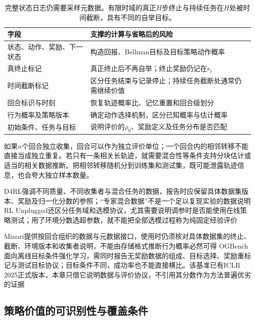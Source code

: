 \begin{table}[htbp]
  \centering
  \small
  \begin{tabularx}{\linewidth}{p{29mm}X}
    \toprule
    字段 & 支撑的计算与省略后的风险 \\
    \midrule
    状态、动作、奖励、下一状态 & 构造回报、Bellman目标及目标策略动作概率 \\
    真终止标记 & 真正终止后不再自举；终止奖励仍记在$r_t$ \\
    时间截断标记 & 区分任务结束与记录停止；持续任务截断处通常仍需继续价值 \\
    回合标识与时刻 & 恢复轨迹概率比、记忆重置和回合级划分 \\
    行为概率及策略版本 & 确定动作选择机制，区分已知概率与估计概率 \\
    初始条件、任务与目标 & 说明评价的$\rho_0$、奖励定义及任务分布是否匹配 \\
    \bottomrule
  \end{tabularx}
  \caption{完整状态日志仍需要采样元数据。有限时域的真正$H$步终止与持续任务在$H$处被时间截断，具有不同的自举目标。}
  \label{tab:rl-information-fields}
\end{table}

如果$n$个回合独立收集，回合可以作为独立评价单位；一个回合内的相邻转移不能直接当成独立重复。若只有一条相关长轨迹，就需要混合性等条件支持分块估计或适当的相关数据推断。把相邻转移随机分到训练集和测试集，既可能泄露轨迹信息，也会夸大独立样本数量。

D4RL强调不同质量、不同收集者与混合任务的数据，报告时应保留具体数据集版本、奖励及归一化分数的参照；“专家混合数据”不是一个足以复现实验的数据说明
RL Unplugged还区分任务域和选模协议，尤其需要说明调参时是否能使用在线策略测试；用了环境分数选超参数，就不能把全部选模过程称为纯固定经验评价

Minari提供按回合组织的数据与元数据接口，使用时仍须核对具体数据集的终止、截断、环境版本和收集者说明，不能由存储格式推断行为概率必然可得
OGBench面向离线目标条件强化学习，需同时报告无奖励数据的组成、目标选择、奖励重标记与测试目标协议；目标条件不同，成功率也不能直接横比。该基准已有ICLR 2025正式版本，本章只借它说明数据与评价协议，不引用其分数作为方法普遍优劣的证据

\subsection{策略价值的可识别性与覆盖条件}
\label{sec:rl-information-coverage}

